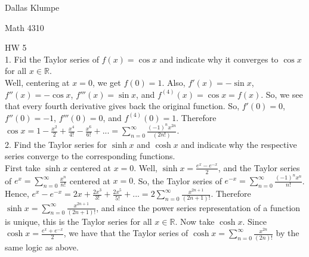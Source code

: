 \documentclass[12pt]{article}
\begin{document}
\noindent Dallas Klumpe

\noindent Math 4310

\noindent HW 5\\

1. Fid the Taylor series of $f(x)=\cos x$ and indicate why it converges to $\cos x$ for all $x\in\mathbb{R}$.\\
Well, centering at $x=0$, we get $f(0)=1$. Also, $f'(x)=-\sin x$, $f''(x)=-\cos x$, $f'''(x)=\sin x$, and $f^{(4)}(x)=\cos x=f(x)$. So, we see that every fourth derivative gives back the original function. So, $f'(0)=0$, $f''(0)=-1$, $f'''(0)=0$, and $f^{(4)}(0)=1$. Therefore $\cos x=1-\frac{x^2}{2}+\frac{x^4}{4!}-\frac{x^6}{6!}+...=\sum_{n=0}^{\infty}\frac{(-1)^nx^{2n}}{(2n!)}$.\\[20pt]

2. Find the Taylor series for $\sinh x$ and $\cosh x$ and indicate why the respective series converge to the corresponding functions.\\
First take $\sinh x$ centered at $x=0$. Well, $\sinh x=\frac{e^x-e^{-x}}{2}$, and the Taylor series of $e^x=\sum_{n=0}^{\infty}\frac{x^n}{n!}$ centered at $x=0$. So, the Taylor series of $e^{-x}=\sum_{n=0}^{\infty}\frac{(-1)^nx^n}{n!}$. Hence, $e^x-e^{-x}=2x+\frac{2x^3}{3!}+\frac{2x^5}{5!}+...=2\sum_{n=0}^{\infty}\frac{x^{2n+1}}{(2n+1)!}$. Therefore $\sinh x=\sum_{n=0}^{\infty}\frac{x^{2n+1}}{(2n+1)!}$, and since the power series representation of a function is unique, this is the Taylor series for all $x\in\mathbb{R}$. Now take $\cosh x$. Since $\cosh x=\frac{e^x+e^{-x}}{2}$, we have that the Taylor series of $\cosh x=\sum_{n=0}^{\infty}\frac{x^{2n}}{(2n)!}$ by the same logic as above.\\[20pt]
\end{document}
